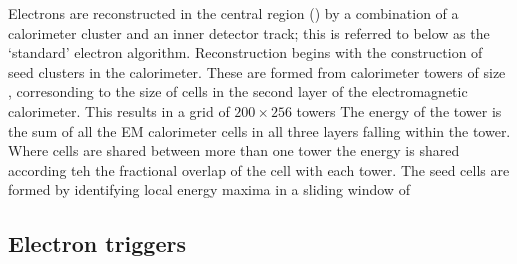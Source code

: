Electrons are reconstructed in the central region () by a
combination of a calorimeter cluster and an inner detector track; this is
referred to below as the `standard' electron algorithm. Reconstruction begins
with the construction of seed clusters in the calorimeter. These are formed from
calorimeter towers of size , corresonding to the
size of cells in the second layer of the electromagnetic calorimeter. This
results in a grid of $200 \times 256$ towers The energy
of the tower is the sum of all the EM calorimeter cells in all three layers
falling within the tower. Where cells are shared between more than one tower the
energy is shared according teh the fractional overlap of the cell with each
tower. The seed cells are formed by identifying local energy maxima in a sliding window of

\subsection{Electron triggers}
\label{sec:reco-el-triggers}
